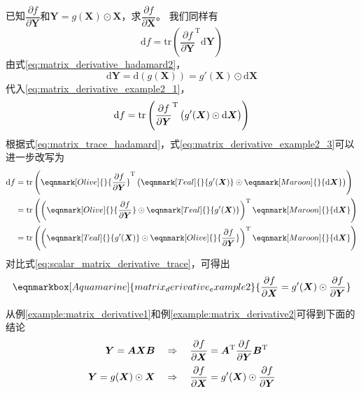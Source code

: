 \begin{example}\label{example:matrix_derivative2}
\colorbox{Aquamarine!30}{已知$\dfrac{\partial f}{\partial \bm{Y}}$和$\bm{Y}=g(\bm{X})\odot\bm{X}$，求$\dfrac{\partial f}{\partial \bm{X}}$}。
我们同样有
\begin{equation}
	\mathrm{d}f = \mathrm{tr}\left({\frac{\partial f}{\partial \bm{Y}}}^{\mathrm{T}}\mathrm{d}\bm{Y}\right)
	\label{eq:matrix_derivative_example2_1}
\end{equation}
由式\eqref{eq:matrix_derivative_hadamard2}，
\begin{equation}
	\mathrm{d}\bm{Y} = \mathrm{d}\left(g(\bm{X})\right) = g'(\bm{X}) \odot \mathrm{d}\bm{X}
	\label{eq:matrix_derivative_example2_2}
\end{equation}
代入\eqref{eq:matrix_derivative_example2_1}，
\begin{equation}
	\mathrm{d}f = \mathrm{tr}\left({\frac{\partial f}{\partial \bm{Y}}}^{\mathrm{T}}\left(\vphantom{A^T}g'(\bm{X}) \odot \mathrm{d}\bm{X}\right)\right)
	\label{eq:matrix_derivative_example2_3}
\end{equation}
根据式\eqref{eq:matrix_trace_hadamard}，式\eqref{eq:matrix_derivative_example2_3}可以进一步改写为
\begin{equation}
	\begin{aligned}
		\mathrm{d}f 
		&= \mathrm{tr}\left(\eqnmark[Olive]{}{\frac{\partial f}{\partial \bm{Y}}}^{\mathrm{T}}\left(\vphantom{A^T}\eqnmark[Teal]{}{g'(\bm{X})} \odot \eqnmark[Maroon]{}{\mathrm{d}\bm{X}}\right)\right) \\
		&= \mathrm{tr}\left(\left({\eqnmark[Olive]{}{\frac{\partial f}{\partial \bm{Y}}}\odot \eqnmark[Teal]{}{g'(\bm{X})}}\right)^{\mathrm{T}}\eqnmark[Maroon]{}{\mathrm{d}\bm{X}}\right) \\
		&= \mathrm{tr}\left(\left({\eqnmark[Teal]{}{g'(\bm{X})} \odot \eqnmark[Olive]{}{\frac{\partial f}{\partial \bm{Y}}}}\right)^{\mathrm{T}}\eqnmark[Maroon]{}{\mathrm{d}\bm{X}}\right)
	\end{aligned}
\end{equation}
对比式\eqref{eq:scalar_matrix_derivative_trace}，可得出
\renewcommand{\eqnhighlightshade}{30}  %
\begin{equation}
	\eqnmarkbox[Aquamarine]{matrix_derivative_example2}{
	\frac{\partial f}{\partial \bm{X}} = g'(\bm{X}) \odot \frac{\partial f}{\partial \bm{Y}}
	}
	\label{eq:matrix_derivative_example2_4}
\end{equation}
\end{example}

从例\ref{example:matrix_derivative1}和例\ref{example:matrix_derivative2}可得到下面的结论
\begin{align}
	\bm{Y}=\bm{A}\bm{X}\bm{B} \quad &\Rightarrow \quad \frac{\partial f}{\partial \bm{X}} = \bm{A}^{\mathrm{T}}\frac{\partial f}{\partial \bm{Y}}\bm{B}^{\mathrm{T}}
	\label{eq:matrix_derivative_conclusion1} \\ %
	\bm{Y}=g(\bm{X})\odot\bm{X} \quad &\Rightarrow \quad \frac{\partial f}{\partial \bm{X}} = g'(\bm{X}) \odot \frac{\partial f}{\partial \bm{Y}} \vphantom{{\frac{\partial f}{\partial \bm{X}}}^{\mathrm{T}}}
	\label{eq:matrix_derivative_conclusion2}  %
\end{align}
